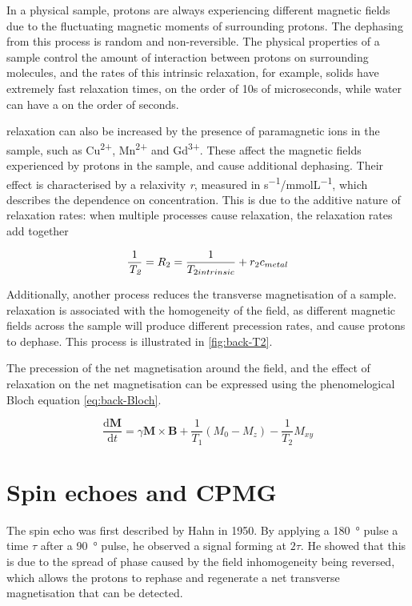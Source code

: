 In a physical sample, protons are always experiencing different magnetic fields due to the fluctuating magnetic moments of surrounding protons.
The dephasing from this process is random and non-reversible.
The physical properties of a sample control the amount of interaction between protons on surrounding molecules, and the rates of this intrinsic \Ttwo relaxation, for example, solids have extremely fast \Ttwo relaxation times, on the order of 10s of microseconds, while water can have a \Ttwo on the order of seconds.

\Ttwo relaxation can also be increased by the presence of paramagnetic ions in the sample, such as Cu\textsuperscript{2+}, Mn\textsuperscript{2+} and Gd\textsuperscript{3+}.
These affect the magnetic fields experienced by protons in the sample, and cause additional dephasing.
Their effect is characterised by a relaxivity \textit{r}, measured in \si{s^{-1}/mmolL^{-1}}, which describes the dependence on concentration.
This is due to the additive nature of relaxation rates: when multiple processes cause relaxation, the relaxation rates add together

\begin{displaymath}
\frac{1}{\textit{T\textsubscript{2}}} = R_2 = \frac{1}{T_{2 intrinsic}} + r_{2} c_{metal}
\end{displaymath}

Additionally, another process reduces the transverse magnetisation of a sample.
\Ttwostar relaxation is associated with the homogeneity of the \Bzero field, as different magnetic fields across the sample will produce different precession rates, and cause protons to dephase.
This process is illustrated in \autoref{fig:back-T2}.

The precession of the net magnetisation around the \Bzero field, and the effect of relaxation on the net magnetisation can be expressed using the phenomelogical Bloch equation \autoref{eq:back-Bloch}.

\begin{equation}
\frac{\mathrm{d}\mathbf{M}}{\mathrm{d}t} = \gamma \mathbf{M} \times \mathbf{B} + \frac{1}{T_1} (M_0 - M_z) - \frac{1}{T_2} M_{xy}
\label{eq:back-Bloch}
\end{equation}

\section{Spin echoes and CPMG}
\label{sec:back-spinecho}
The spin echo was first described by Hahn in 1950\cite{HahnSpinEchoes1950}.
By applying a \SI{180}{\degree} pulse a time $\tau$ after a \SI{90}{\degree} pulse, he observed a signal forming at $2\tau$.
He showed that this is due to the spread of phase caused by the \Bzero field inhomogeneity being reversed, which allows the protons to rephase and regenerate a net transverse magnetisation that can be detected.

